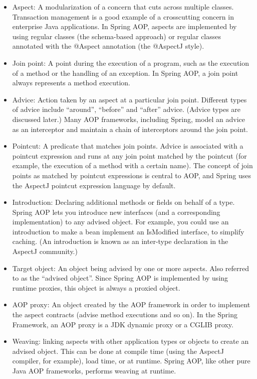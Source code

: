 \begin{itemize}
    \item Aspect: A modularization of a concern that cuts across multiple classes. Transaction
    management is a good example of a crosscutting concern in enterprise Java applications. In
    Spring AOP, aspects are implemented by using regular classes (the schema-based approach) or
    regular classes annotated with the @Aspect annotation (the @AspectJ style).
    \item Join point: A point during the execution of a program, such as the execution of a method or the
    handling of an exception. In Spring AOP, a join point always represents a method execution.
    \item Advice: Action taken by an aspect at a particular join point. Different types of advice include
    “around”, “before” and “after” advice. (Advice types are discussed later.) Many AOP
    frameworks, including Spring, model an advice as an interceptor and maintain a chain of
    interceptors around the join point.
    \item Pointcut: A predicate that matches join points. Advice is associated with a pointcut expression
    and runs at any join point matched by the pointcut (for example, the execution of a method
    with a certain name). The concept of join points as matched by pointcut expressions is central to
    AOP, and Spring uses the AspectJ pointcut expression language by default.
    \item Introduction: Declaring additional methods or fields on behalf of a type. Spring AOP lets you
    introduce new interfaces (and a corresponding implementation) to any advised object. For
    example, you could use an introduction to make a bean implement an IsModified interface, to
    simplify caching. (An introduction is known as an inter-type declaration in the AspectJ
    community.)
    \item Target object: An object being advised by one or more aspects. Also referred to as the “advised
    object”. Since Spring AOP is implemented by using runtime proxies, this object is always a
    proxied object.
    \item AOP proxy: An object created by the AOP framework in order to implement the aspect contracts
    (advise method executions and so on). In the Spring Framework, an AOP proxy is a JDK dynamic
    proxy or a CGLIB proxy.
    \item Weaving: linking aspects with other application types or objects to create an advised object. This
    can be done at compile time (using the AspectJ compiler, for example), load time, or at runtime.
    Spring AOP, like other pure Java AOP frameworks, performs weaving at runtime.
\end{itemize}


